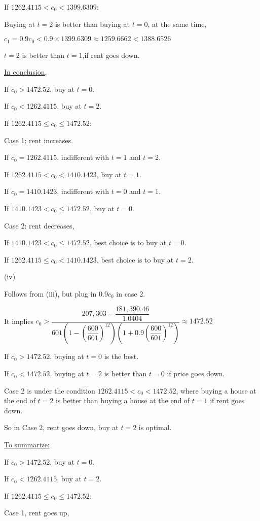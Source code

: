 \documentclass{article}
\begin{document}
If $1262.4115<c_{0}<1399.6309$:

Buying at $t=2$ is better than buying at $t=0$, at the same time, 

$c_{1}=0.9c_{0}<0.9\times1399.6309\approx1259.6662<1388.6526$

$t=2$ is better than $t=1$,if rent goes down.

\underline{In conclusion,}

If $c_{0}>1472.52$, buy at $t=0$.

If $c_{0}<1262.4115$, buy at $t=2$.

If $1262.4115\leqslant c_{0}\leqslant1472.52$:

Case 1: rent increases.

If $c_{0}=1262.4115$, indifferent with $t=1$ and $t=2$.

If $1262.4115<c_{0}<1410.1423$, buy at $t=1$.

If $c_{0}=1410.1423$, indifferent with $t=0$ and $t=1$.

If $1410.1423<c_{0}\leqslant1472.52$, buy at $t=0$.

Case 2: rent decreases,

If $1410.1423<c_{0}\leqslant1472.52$, best choice is to buy at $t=0$.

If $1262.4115\leqslant c_{0}<1410.1423$, best choice is to buy at $t=2$.

(iv)

Follows from (iii), but plug in $0.9c_{0}$ in case 2.

It implies $c_{0}>\dfrac{207,303-\dfrac{181,390.46}{1.0404}}{601\left(1-\left(\dfrac{600}{601}\right)^{12}\right)\left(1+0.9\left(\dfrac{600}{601}\right)^{12}\right)}\approx1472.52$

If $c_{0}>1472.52$, buying at $t=0$ is the best.

If $c_{0}<1472.52$, buying at $t=2$ is better than $t=0$ if price goes down.

Case 2 is under the condition $1262.4115<c_{0}<1472.52$, where buying a house at the end of $t=2$ is better than buying a house at the end of $t=1$ if rent goes down. 

So in Case 2, rent goes down, buy at $t=2$ is optimal.

\underline{To summarize:} 

If $c_{0}>1472.52$, buy at $t=0$.

If $c_{0}<1262.4115$, buy at $t=2$.

If $1262.4115\leqslant c_{0}\leqslant1472.52$:

Case 1, rent goes up, 
\end{document}
